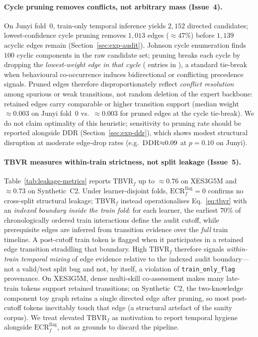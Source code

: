 \documentclass[runningheads]{llncs}
\newcommand{\KC}{knowledge component}
\newcommand{\DDR}{\textsc{DDR}}
\begin{document}
\paragraph{Cycle pruning removes conflicts, not arbitrary mass (Issue~4).}
On Junyi fold~0, train-only temporal inference yields $2{,}152$ directed
candidates; lowest-confidence cycle pruning removes $1{,}013$ edges
(${\approx}47\%$) before $1{,}139$ acyclic edges remain
(Section~\ref{sec:exp-audit}).
Johnson cycle enumeration finds $100$ cyclic components in the raw
candidate set; pruning breaks each cycle by dropping the \emph{lowest-weight
edge in that cycle} ( entries in
), a standard tie-break when
behavioural co-occurrence induces bidirectional or conflicting precedence
signals.
Pruned edges therefore disproportionately reflect \emph{conflict resolution}
among spurious or weak transitions, not random deletion of the expert
backbone: retained edges carry comparable or higher transition support
(median weight ${\approx}0.003$ on Junyi fold~0 vs.\ ${\approx}0.003$ for
pruned edges at the cycle tie-break).
We do not claim optimality of this heuristic; sensitivity to pruning rate
should be reported alongside \DDR{} (Section~\ref{sec:exp-ddr}), which
shows modest structural disruption at moderate edge-drop rates
(e.g.\ $\DDR{\approx}0.09$ at $p{=}0.10$ on Junyi).

\paragraph{TBVR measures within-train strictness, not split leakage (Issue~5).}
Table~\ref{tab:leakage-metrics} reports $\mathrm{TBVR}_f$ up to
${\approx}0.76$ on XES3G5M and ${\approx}0.73$ on Synthetic~C2.
Under learner-disjoint folds, $\mathrm{ECR}^{\mathrm{flag}}_f{=}0$ confirms
no cross-split structural leakage; $\mathrm{TBVR}_f$ instead operationalises
Eq.~\eqref{eq:tbvr} with an \emph{indexed boundary inside the train
fold}: for each learner, the earliest $70\%$ of chronologically ordered
train interactions define the audit cutoff, while prerequisite edges are
inferred from transition evidence over the \emph{full} train timeline.
A post-cutoff train token is flagged when it participates in a retained
edge transition straddling that boundary.
High $\mathrm{TBVR}_f$ therefore signals \emph{within-train temporal
mixing} of edge evidence relative to the indexed audit boundary---not a
valid/test split bug and not, by itself, a violation of
\texttt{train\_only\_flag} provenance.
On XES3G5M, dense multi-skill co-assessment makes many late-train tokens
support retained transitions; on Synthetic~C2, the two-\KC{} toy graph
retains a single directed edge after pruning, so most post-cutoff tokens
inevitably touch that edge (a structural artefact of the sanity corpus).
We treat elevated $\mathrm{TBVR}_f$ as motivation to report temporal
hygiene alongside $\mathrm{ECR}^{\mathrm{flag}}_f$, not as grounds to
discard the pipeline.
\end{document}
